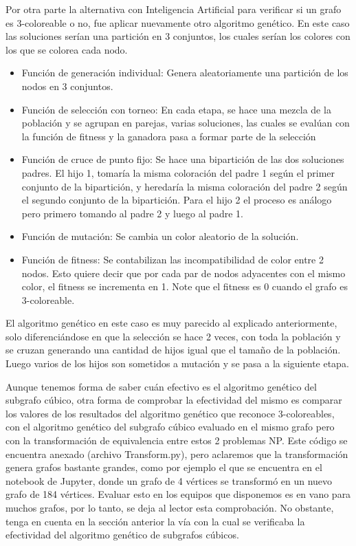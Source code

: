 \documentclass{article}
\begin{document}
Por otra parte la alternativa con Inteligencia Artificial para verificar si un grafo es 3-coloreable o no, fue aplicar nuevamente otro algoritmo genético. En este caso las soluciones serían una partición en 3 conjuntos, los cuales serían los colores con los que se colorea cada nodo.

\begin{itemize}
	\item Función de generación individual: Genera aleatoriamente una partición de los nodos en 3 conjuntos.
	\item Función de selección con torneo: En cada etapa, se hace una mezcla de la población y se agrupan en parejas, varias soluciones, las cuales se evalúan con la función de fitness y la ganadora pasa a formar parte de la selección
	\item Función de cruce de punto fijo: Se hace una bipartición de las dos soluciones padres. El hijo 1, tomaría la misma coloración del padre 1 según el primer conjunto de la bipartición, y heredaría la misma coloración del padre 2 según el segundo conjunto de la bipartición. Para el hijo 2 el proceso es análogo pero primero tomando al padre 2 y luego al padre 1.
	\item Función de mutación: Se cambia un color aleatorio de la solución.
	\item Función de fitness: Se contabilizan las incompatibilidad de color entre 2 nodos. Esto quiere decir que por cada par de nodos adyacentes con el mismo color, el fitness se incrementa en 1. Note que el fitness es 0 cuando el grafo es 3-coloreable.
\end{itemize}

El algoritmo genético en este caso es muy parecido al explicado anteriormente, solo diferenciándose en que la selección se hace 2 veces, con toda la población y se cruzan generando una cantidad de hijos igual que el tamaño de la población. Luego varios de los hijos son sometidos a mutación y se pasa a la siguiente etapa.

Aunque tenemos forma de saber cuán efectivo es el algoritmo genético del subgrafo cúbico, otra forma de comprobar la efectividad del mismo es comparar los valores de los resultados del algoritmo genético que reconoce 3-coloreables, con el algoritmo genético del subgrafo cúbico evaluado en el mismo grafo pero con la transformación de equivalencia entre estos 2 problemas NP. Este código se encuentra anexado (archivo Transform.py), pero aclaremos que la transformación genera grafos bastante grandes, como por ejemplo el que se encuentra en el notebook de Jupyter, donde un grafo de 4 vértices se transformó en un nuevo grafo de 184 vértices. Evaluar esto en los equipos que disponemos es en vano para muchos grafos, por lo tanto, se deja al lector esta comprobación. No obstante, tenga en cuenta en la sección anterior la vía con la cual se verificaba la efectividad del algoritmo genético de subgrafos cúbicos.
\end{document}
